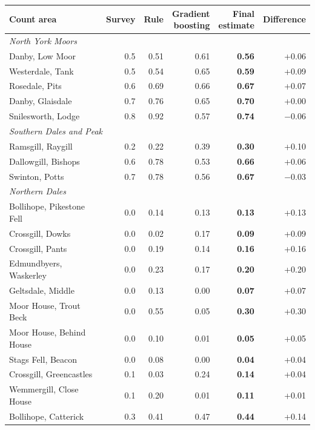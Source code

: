 \begin{tabular}{lrrrrr}
\toprule
Count area & Survey & Rule & \makecell[r]{Gradient\\boosting} & \makecell[r]{Final\\estimate} & Difference \\
\midrule
\multicolumn{6}{l}{\textit{North York Moors}} \\
Danby, Low Moor & 0.5 & 0.51 & 0.61 & \textbf{0.56} & +0.06 \\
Westerdale, Tank & 0.5 & 0.54 & 0.65 & \textbf{0.59} & +0.09 \\
Rosedale, Pits & 0.6 & 0.69 & 0.66 & \textbf{0.67} & +0.07 \\
Danby, Glaisdale & 0.7 & 0.76 & 0.65 & \textbf{0.70} & +0.00 \\
Snilesworth, Lodge & 0.8 & 0.92 & 0.57 & \textbf{0.74} & $-$0.06 \\
\midrule
\multicolumn{6}{l}{\textit{Southern Dales and Peak}} \\
Ramsgill, Raygill & 0.2 & 0.22 & 0.39 & \textbf{0.30} & +0.10 \\
Dallowgill, Bishops & 0.6 & 0.78 & 0.53 & \textbf{0.66} & +0.06 \\
Swinton, Potts & 0.7 & 0.78 & 0.56 & \textbf{0.67} & $-$0.03 \\
\midrule
\multicolumn{6}{l}{\textit{Northern Dales}} \\
Bollihope, Pikestone Fell & 0.0 & 0.14 & 0.13 & \textbf{0.13} & +0.13 \\
Crossgill, Dowks & 0.0 & 0.02 & 0.17 & \textbf{0.09} & +0.09 \\
Crossgill, Pants & 0.0 & 0.19 & 0.14 & \textbf{0.16} & +0.16 \\
Edmundbyers, Waskerley & 0.0 & 0.23 & 0.17 & \textbf{0.20} & +0.20 \\
Geltsdale, Middle & 0.0 & 0.13 & 0.00 & \textbf{0.07} & +0.07 \\
Moor House, Trout Beck & 0.0 & 0.55 & 0.05 & \textbf{0.30} & +0.30 \\
Moor House, Behind House & 0.0 & 0.10 & 0.01 & \textbf{0.05} & +0.05 \\
Stags Fell, Beacon & 0.0 & 0.08 & 0.00 & \textbf{0.04} & +0.04 \\
Crossgill, Greencastles & 0.1 & 0.03 & 0.24 & \textbf{0.14} & +0.04 \\
Wemmergill, Close House & 0.1 & 0.20 & 0.01 & \textbf{0.11} & +0.01 \\
Bollihope, Catterick & 0.3 & 0.41 & 0.47 & \textbf{0.44} & +0.14 \\

\end{tabular}
